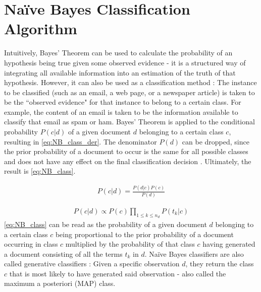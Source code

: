 \section{Na\"ive Bayes Classification Algorithm} \label{sec:NB_class}

Intuitively, Bayes' Theorem can be used to calculate the probability of an hypothesis being true given some observed evidence \citep{Manning2009, martin2018speech, Rijsbergen1979} - it is a structured way of integrating all available information into an estimation of the truth of that hypothesis. However, it can also be used as a classification method \citep{Manning2009, martin2018speech, Murphy2012, Rijsbergen1979}: The instance to be classified (such as an email, a web page, or a newspaper article) is taken to be the ``observed evidence" for that instance to belong to a certain class. For example, the content of an email is taken to be the information available to classify that email as spam or ham. Bayes' Theorem is applied to the conditional probability $P(c|d)$ of a given document $d$ belonging to a certain class $c$, resulting in \eqref{eq:NB_class_der}. The denominator $P(d)$ can be dropped, since the prior probability of a document to occur is the same for all possible classes and does not have any effect on the final classification decision \citep{martin2018speech}. Ultimately, the result is \eqref{eq:NB_class}.

\begin{gather}
    P(c|d) = \frac{P(d|c)P(c)}{P(d)} \label{eq:NB_class_der}
\end{gather}

\begin{gather}
    P(c|d) \propto P(c) \prod_{1 \leq k \leq n_{d}} P(t_{k}|c)\label{eq:NB_class}
\end{gather}
\eqref{eq:NB_class} can be read as the probability of a given document $d$ belonging to a certain class $c$ being proportional to the prior probability of a document occurring in class $c$ multiplied by the probability of that class $c$ having generated a document consisting of all the terms $t_{k}$ in $d$. Na\"ive Bayes classifiers are also called generative classifiers \citep{Murphy2012}: Given a specific observation $d$, they return the class $c$ that is most likely to have generated said observation - also called the maximum a posteriori (MAP) class.


